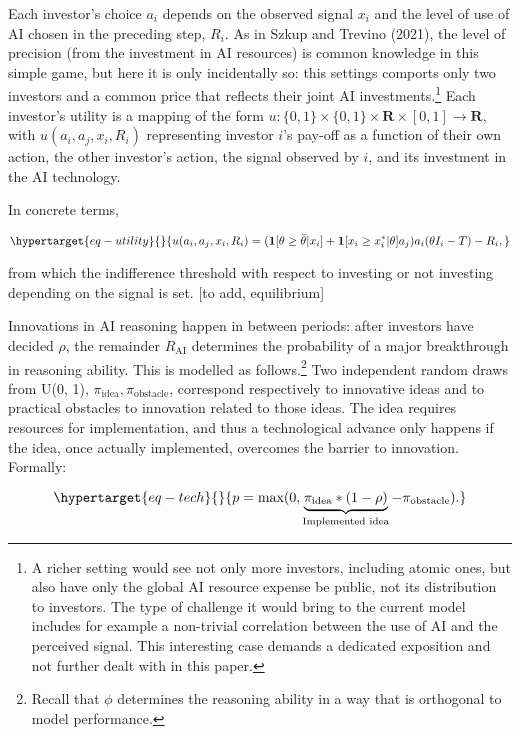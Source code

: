 \documentclass[
]{article}
\theoremstyle{plain}
\theoremstyle{remark}
\begin{document}
Each investor's choice \(a_i\) depends on the observed signal \(x_i\)
and the level of use of AI chosen in the preceding step, \(R_i\). As in
Szkup and Trevino (2021), the level of precision (from the investment in
AI resources) is common knowledge in this simple game, but here it is
only incidentally so: this settings comports only two investors and a
common price that reflects their joint AI investments.\footnote{A richer
  setting would see not only more investors, including atomic ones, but
  also have only the global AI resource expense be public, not its
  distribution to investors. The type of challenge it would bring to the
  current model includes for example a non-trivial correlation between
  the use of AI and the perceived signal. This interesting case demands
  a dedicated exposition and not further dealt with in this paper.} Each
investor's utility is a mapping of the form
\(u : \{0, 1\} \times \{0, 1\} \times \mathbf{R} \times [0, 1] \to \mathbf{R}\),
with \(u(a_i, a_j, x_i, R_i)\) representing investor \(i\)'s pay-off as
a function of their own action, the other investor's action, the signal
observed by \(i\), and its investment in the AI technology.

In concrete terms,

\begin{equation}\protect\hypertarget{eq-utility}{}{
u(a_i, a_j, x_i, R_i) = (\mathbf{1}[\theta \geq \bar{\theta}|x_i] + \mathbf{1}[x_i \geq x_i^*|\theta]a_j)a_i(\theta I_i - T) - R_i,
}\label{eq-utility}\end{equation}

from which the indifference threshold with respect to investing or not
investing depending on the signal is set. {[}to add, equilibrium{]}

Innovations in AI reasoning happen in between periods: after investors
have decided \(\rho\), the remainder \(R_{\text{AI}}\) determines the
probability of a major breakthrough in reasoning ability. This is
modelled as follows.\footnote{Recall that \(\phi\) determines the
  reasoning ability in a way that is orthogonal to model performance.}
Two independent random draws from U(0, 1),
\(\pi_{\text{idea}}, \pi_{\text{obstacle}}\), correspond respectively to
innovative ideas and to practical obstacles to innovation related to
those ideas. The idea requires resources for implementation, and thus a
technological advance only happens if the idea, once actually
implemented, overcomes the barrier to innovation. Formally:

\begin{equation}\protect\hypertarget{eq-tech}{}{
p = \text{max}(0, \underbrace{\pi_{\text{idea}} * (1-\rho)}_{\text{Implemented idea}} - \pi_{\text{obstacle}}).
}\label{eq-tech}\end{equation}
\end{document}
